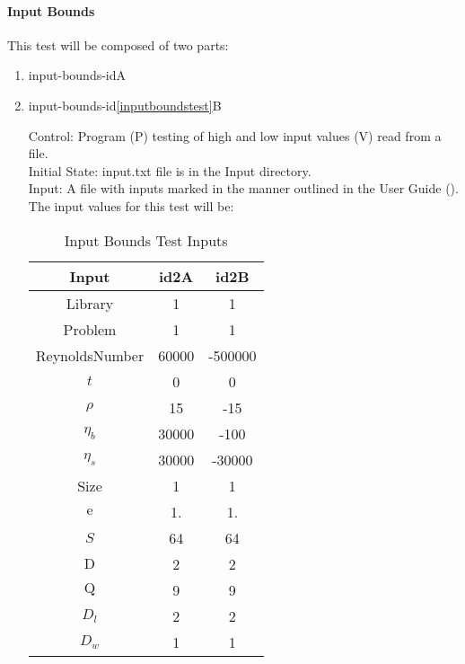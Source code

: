 \documentclass[12pt, titlepage]{article}
\newcounter{testcounter} %
\begin{document}
\paragraph{Input Bounds}
This test will be composed of two parts:
\begin{enumerate}
						
\item{input-bounds-id\thetestcounter A \label{inputboundstest}}
\item{input-bounds-id\ref{inputboundstest}B\\}

Control: Program (P) testing of high and low input values (V) read from a file.\\
					
Initial State: input.txt file is in the Input directory.\\
					
Input: A file with inputs marked in the manner outlined in the
User Guide (\citet{LBM_UserGuide_PM}).\\The input values for this test will
be:\\

\begin{table}[!h]
	\begin{center}
		\begin{tabular}{| c | c | c |}
			\hline
			Input & id2A & id2B \\
			\hline
			  Library & 1 & 1\\
			  \hline
			Problem & 1 & 1\\
			\hline
			ReynoldsNumber & 60000 & -500000 \\
			\hline
			$t$ & 0& 0\\
			\hline
			$\rho$ & 15& -15\\
			\hline
			$\eta_b$ & 30000& -100\\
			\hline
			$\eta_s$ & 30000& -30000\\
			\hline
			Size & 1& 1\\
			\hline
			$\mathrm{e}$ & 1.& 1.\\
			\hline
			$S$ & 64& 64\\
			\hline
			$\mathrm{D}$ & 2& 2\\
			\hline
			$\mathrm{Q}$ & 9& 9\\
			\hline
			$D_{l}$ & 2& 2\\
			\hline
			$D_{w}$ & 1& 1\\
			\hline
		\end{tabular}
		\caption{Input Bounds Test Inputs}
	\end{center}
\end{table}
	

\end{enumerate}
\end{document}
